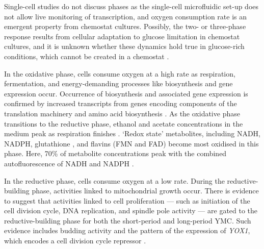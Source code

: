 Single-cell studies \citep{papagiannakisAutonomousMetabolicOscillations2017, baumgartnerFlavinbasedMetabolicCycles2018} do not discuss phases as the single-cell microfluidic set-up does not allow live monitoring of transcription, and oxygen consumption rate is an emergent property from chemostat cultures.
Possibly, the two- or three-phase response results from cellular adaptation to glucose limitation in chemostat cultures, and it is unknown whether these dynamics hold true in glucose-rich conditions, which cannot be created in a chemostat \citep{slavovCouplingGrowthRate2011}.

In the oxidative phase, cells consume oxygen at a high rate as respiration, fermentation, and
energy-demanding processes
like biosynthesis and gene expression occur.
Occurrence of biosynthesis and associated gene expression is confirmed by increased transcripts from genes encoding components of the translation machinery and amino acid biosynthesis \parencite{tuLogicYeastMetabolic2005}.
As the oxidative phase transitions to the reductive phase, ethanol and acetate concentrations in the medium peak as respiration finishes \citep{tuLogicYeastMetabolic2005}.
`Redox state' metabolites, including NADH, NADPH, glutathione \citep{lloydUltradianMetronomeTimekeeper2005}, and flavins (FMN and FAD)
\parencite{murrayRedoxRegulationRespiring2011} become most oxidised in this phase.
Here, 70\% of metabolite concentrations peak with the combined autofluorescence of NADH and NADPH \citep{murrayRegulationYeastOscillatory2007}.

In the reductive phase, cells consume oxygen at a low rate.
During the reductive-building phase, activities linked to mitochondrial growth occur.
There is evidence to suggest that activities linked to cell proliferation --- such as initiation of the cell division cycle, DNA replication, and spindle pole activity --- are gated to the reductive-building phase for both the short-period and long-period YMC.
Such evidence includes budding activity and the pattern of the expression of \emph{YOX1}, which encodes a cell division cycle repressor \citep{tuLogicYeastMetabolic2005}.

